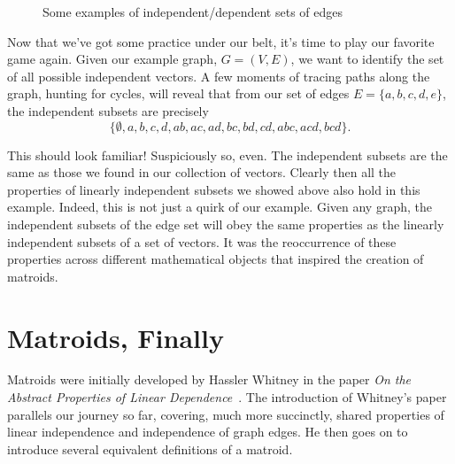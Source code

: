 \documentclass[12pt,oneside]{../../sfsuthesis}
\begin{document}
\begin{figure}[H]
\begin{subfigure}[t]{0.3\textwidth}

    \end{subfigure}
    \caption{Some examples of independent/dependent sets of edges}
\end{figure}

Now that we've got some practice under our belt, it's time to play our favorite game again.
Given our example graph, \( G = (V, E) \), we want to identify the set of all possible independent vectors.
A few moments of tracing paths along the graph, hunting for cycles, will reveal that from our set of edges \( E = \{ a, b, c, d, e \} \), the independent subsets are precisely
\[
    \{
    \emptyset,
    a, b, c, d,
    ab, ac, ad, bc, bd, cd,
    abc, acd, bcd
    \}.
\]

This should look familiar!
Suspiciously so, even.
The independent subsets are the same as those we found in our collection of vectors.
Clearly then all the properties of linearly independent subsets we showed above also hold in this example.
Indeed, this is not just a quirk of our example.
Given any graph, the independent subsets of the edge set will obey the same properties as the linearly independent subsets of a set of vectors.
It was the reoccurrence of these properties across different mathematical objects that inspired the creation of matroids.

\section{Matroids, Finally}

Matroids were initially developed by Hassler Whitney in the paper \textit{On the Abstract Properties of Linear Dependence}~\cite{whitneyAbstractPropertiesLinear1935}.
The introduction of Whitney's paper parallels our journey so far, covering, much more succinctly, shared properties of linear independence and independence of graph edges.
He then goes on  to introduce several equivalent definitions of a matroid.
\end{document}

